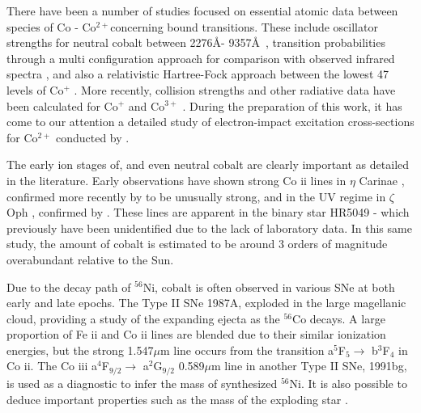 There have been a number of studies focused on essential atomic data between species of Co - Co$^{2+}$concerning bound transitions. These include oscillator strengths for neutral cobalt between 2276\AA - 9357\AA ~\citep{1982ApJ...260..395C}, transition probabilities through a multi configuration approach for comparison with observed infrared spectra \citep{1988A&A...200L..25N}, and also a relativistic Hartree-Fock approach between the lowest 47 levels of Co$^{+}$ \citep{1998A&AS..129..147Q}. More recently, collision strengths and other radiative data have been calculated for Co$^{+}$ \citep{2016MNRAS.456.1974S} and Co$^{3+}$ \citep{2016ADNDT.107..140A}. During the preparation of this work, it has come to our attention a detailed study of electron-impact excitation cross-sections for Co$^{2+}$ conducted by \citet{2016MNRAS.tmp..556S}.

The early ion stages of, and even neutral cobalt are clearly important as detailed in the literature. Early observations have shown strong Co {\sc ii} lines in $\eta$ Carinae \citep{1976MNRAS.174P..59T}, confirmed more recently by \citet{2001AJ....122..322Z} to be unusually strong, and in the UV regime in $\zeta$ Oph \citep{1979ApJ...234..506S}, confirmed by \citet{1993ApJ...413L..51F}. These lines are apparent in the binary star HR5049 \citep{1980A&A....85..138D, 1982Obs...102..138D} - which previously have been unidentified due to the lack of laboratory data. In this same study, the amount of cobalt is estimated to be around 3 orders of magnitude overabundant relative to the Sun.

Due to the decay path of $^{56}$Ni, cobalt is often observed in various SNe at both early and late epochs. The Type II SNe 1987A, exploded in the large magellanic cloud, providing a study of the expanding ejecta as the $^{56}$Co decays. A large proportion of Fe {\sc ii} and Co {\sc ii} lines are blended due to their similar ionization energies, but the strong 1.547$\mu$m line occurs from the transition a$^5$F$_5\rightarrow$ b$^3$F$_4$ \citep{1989MNRAS.238..193M, 1993ApJ...419..824L} in Co {\sc ii}. The Co {\sc iii} a$^4$F$_{9/2}\rightarrow$ a$^2$G$_{9/2}$ 0.589$\mu$m line in another Type II SNe, 1991bg, is used as a diagnostic to infer the mass of synthesized $^{56}$Ni. It is also possible to deduce important properties such as the mass of the exploding star \citep{1997MNRAS.284..151M}.

